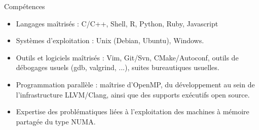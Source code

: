 \documentclass{cv}
\begin{document}
\begin{rubrique}{Compétences}%

  \begin{itemize}
    \item Langages maîtrisés : C/C++, Shell, R, Python, Ruby, Javascript

    \item Systèmes d'exploitation : Unix (Debian, Ubuntu), Windows.

    \item Outils et logiciels maîtrisés : Vim, Git/Svn, CMake/Autoconf, outils de débogages usuels (gdb, valgrind, ...), suites bureautiques usuelles.

    \item Programmation parallèle : maîtrise d'OpenMP, du développement au sein de l'infrastructure LLVM/Clang, ainsi que des supports exécutifs open source.


    \item Expertise des problématiques liées à l'exploitation des machines à mémoire partagée du type NUMA.
  \end{itemize}

\end{rubrique}
\end{document}
